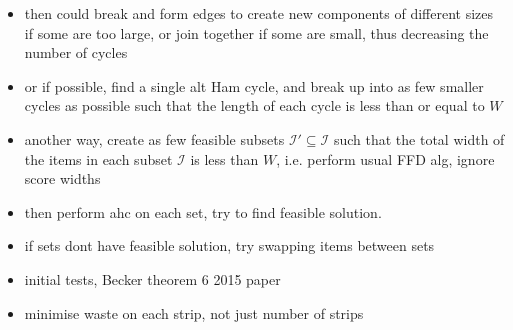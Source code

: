 \documentclass[runningheads]{llncs}
\begin{document}
\begin{itemize}
	\item then could break and form edges to create new components of different sizes if some are too large, or join together if some are small, thus decreasing the number of cycles
	\item or if possible, find a single alt Ham cycle, and break up into as few smaller cycles as possible such that the length of each cycle is less than or equal to $W$
	\item another way, create as few feasible subsets $\mathcal{I}' \subseteq \mathcal{I}$ such that the total width of the items in each subset $\mathcal{I}$ is less than $W$, i.e. perform usual FFD alg, ignore score widths
	\item then perform ahc on each set, try to find feasible solution.
	\item if sets dont have feasible solution, try swapping items between sets
	\item initial tests, Becker theorem 6 2015 paper \cite{garraffa2016}
	\item minimise waste on each strip, not just number of strips
\end{itemize}
\end{document}
